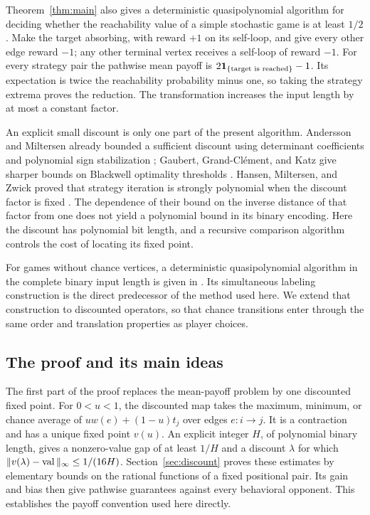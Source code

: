 Theorem~\ref{thm:main} also gives a deterministic quasipolynomial
algorithm for deciding whether the reachability value of a simple
stochastic game is at least $1/2$. Make the target absorbing, with
reward $+1$ on its self-loop, and give every other edge reward $-1$;
any other terminal vertex receives a self-loop of reward $-1$.
For every strategy pair the pathwise mean payoff is
$2\mathbf 1_{\{\text{target is reached}\}}-1$.
Its expectation is twice the reachability probability minus one,
so taking the strategy extrema proves the reduction. The transformation
increases the input length by at most a constant factor.

An explicit small discount is only one part of the present algorithm.
Andersson and Miltersen already bounded a sufficient discount using
determinant coefficients and polynomial sign stabilization
\cite[Lemma~1]{AnderssonMiltersen2009}; Gaubert, Grand-Cl\'ement,
and Katz give sharper bounds on Blackwell optimality thresholds
\cite{GaubertGrandClementKatz2025}.
Hansen, Miltersen, and Zwick proved that strategy iteration is
strongly polynomial when the discount factor is fixed
\cite{HansenMiltersenZwick2013}. The dependence of their bound on
the inverse distance of that factor from one does not yield a
polynomial bound in its binary encoding. Here the discount has
polynomial bit length, and a recursive comparison algorithm controls
the cost of locating its fixed point.

For games without chance vertices, a deterministic quasipolynomial
algorithm in the complete binary input length is given in
\citet[Theorem~1.1]{OpenAI2026Deterministic}. Its simultaneous labeling
construction is the direct predecessor of the method used here. We
extend that construction to discounted operators, so that chance
transitions enter through the same order and translation properties
as player choices.

\subsection{The proof and its main ideas}

The first part of the proof replaces the mean-payoff problem by one
discounted fixed point. For $0<u<1$, the discounted map takes the maximum,
minimum, or chance average of $u w(e)+(1-u)t_j$ over edges $e:i\to j$.
It is a contraction and has a unique fixed point $v(u)$. An explicit
integer $H$, of polynomial binary length, gives a nonzero-value gap of
at least $1/H$ and a discount $\lambda$ for which
$\|v(\lambda)-\operatorname{val}\|_\infty\le1/(16H)$. Section~\ref{sec:discount}
proves these estimates by elementary bounds on the rational functions
of a fixed positional pair. Its gain and bias then give pathwise
guarantees against every behavioral opponent. This establishes the
payoff convention used here directly.


